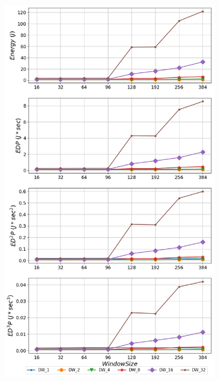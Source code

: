    \begin{minipage}{\textwidth}
      \begin{center}
         \\
         \vspace{3mm}
         \includegraphics[width=0.7\textwidth]{./graphs/edp/gcc.png}
         \vspace{6mm}
      \end{center}
   \end{minipage}

